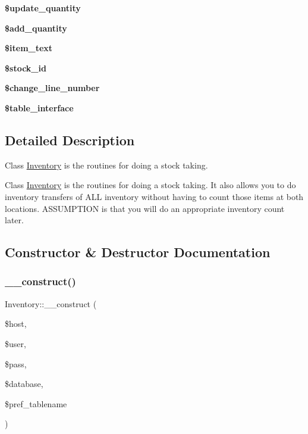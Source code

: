 \begin{DoxyCompactItemize}
\item 
\hypertarget{class_inventory_a22a5cb92bfa2d65eb7070e8c5164ba61}{}\label{class_inventory_a22a5cb92bfa2d65eb7070e8c5164ba61} 
{\bfseries \$update\+\_\+quantity}
\item 
\hypertarget{class_inventory_a0cade591b02c5dc6e280d7d90e2fa3b4}{}\label{class_inventory_a0cade591b02c5dc6e280d7d90e2fa3b4} 
{\bfseries \$add\+\_\+quantity}
\item 
\hypertarget{class_inventory_aff1f3648941f2cd2c8e787989b679bb8}{}\label{class_inventory_aff1f3648941f2cd2c8e787989b679bb8} 
{\bfseries \$item\+\_\+text}
\item 
\hypertarget{class_inventory_ac6b30b7db054bca3509a961d4b21143d}{}\label{class_inventory_ac6b30b7db054bca3509a961d4b21143d} 
{\bfseries \$stock\+\_\+id}
\item 
\hypertarget{class_inventory_ae2d8bc329f9ebbdfd75325b5e8f27a59}{}\label{class_inventory_ae2d8bc329f9ebbdfd75325b5e8f27a59} 
{\bfseries \$change\+\_\+line\+\_\+number}
\item 
\hypertarget{class_inventory_a886ee1cbe6cb6a36a4573057f41bef25}{}\label{class_inventory_a886ee1cbe6cb6a36a4573057f41bef25} 
{\bfseries \$table\+\_\+interface}
\end{DoxyCompactItemize}


\subsection{Detailed Description}
Class \hyperlink{class_inventory}{Inventory} is the routines for doing a stock taking.

Class \hyperlink{class_inventory}{Inventory} is the routines for doing a stock taking. It also allows you to do inventory transfers of A\+LL inventory without having to count those items at both locations. A\+S\+S\+U\+M\+P\+T\+I\+ON is that you will do an appropriate inventory count later. 

\subsection{Constructor \& Destructor Documentation}
\hypertarget{class_inventory_a3d94ae6f942f9c10ba12a75b57ec1d43}{}\label{class_inventory_a3d94ae6f942f9c10ba12a75b57ec1d43} 
\subsubsection{\texorpdfstring{\+\_\+\+\_\+construct()}{\_\_construct()}}
{\footnotesize\ttfamily Inventory\+::\+\_\+\+\_\+construct (\begin{DoxyParamCaption}\item[{}]{\$host,  }\item[{}]{\$user,  }\item[{}]{\$pass,  }\item[{}]{\$database,  }\item[{}]{\$pref\+\_\+tablename }\end{DoxyParamCaption})}

